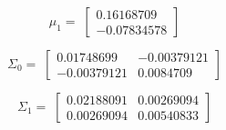 \documentclass[11pt]{article}
\begin{document}
\begin{equation*}
\mu_1 = \;
\begin{bmatrix}
0.16168709\\
-0.07834578
\end{bmatrix}
\end{equation*}

\begin{equation*}
\Sigma_0 = \;
\begin{bmatrix}
0.01748699& -0.00379121\\
-0.00379121&  0.0084709
\end{bmatrix}
\end{equation*}

\begin{equation*}
\Sigma_1 = \;
\begin{bmatrix}
0.02188091& 0.00269094\\
0.00269094& 0.00540833
\end{bmatrix}
\end{equation*}
\end{document}
